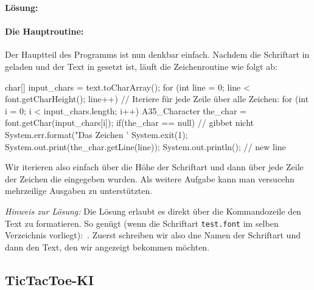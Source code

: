 \documentclass[table]{sopra-base}
\makeatletter
\let\T\texttt
\newenvironment{solution}{\null\par\noindent\textbf{\textcolor{sob@col@uulm@cs}{Lösung:}}\newline\bgroup\color{black}\slshape\ignorespaces}{\egroup}
\makeatother
\begin{document}
\begin{solution}
\paragraph{Die Hauptroutine:}
Der Hauptteil des Programms ist nun denkbar einfach. Nachdem die Schriftart in  geladen und der Text in  gesetzt ist, läuft die Zeichenroutine wie folgt ab:
\begin{java}[firstnumber=32]
char[] input_chars = text.toCharArray();
for (int line = 0; line < font.getCharHeight(); line++) {
    // Iteriere für jede Zeile über alle Zeichen:
    for (int i = 0; i < input_chars.length; i++) {
        A35_Character the_char = font.getChar(input_chars[i]);
        if(the_char == null) { // gibbet nicht
            System.err.format("Das Zeichen '%
            System.exit(1);
        }
        System.out.print(the_char.getLine(line));
    }
    System.out.println(); // new line
}
\end{java}
    Wir iterieren also einfach über die Höhe der Schriftart und dann über jede Zeile der Zeichen die eingegeben wurden. Als weitere Aufgabe kann man versucehn mehrzeilige Ausgaben zu unterstützten.\par{}
    \textit{Hinweis zur Lösung:} Die Lösung erlaubt es direkt über die Kommandozeile den Text zu formatieren. So genügt (wenn die Schriftart \T{test.font} im selben Verzeichnis vorliegt): \,. Zuerst schreiben wir also dne Namen der Schriftart und dann den Text, den wir angezeigt bekommen möchten.
    \egroup
\end{solution}

\subsection{TicTacToe-KI}
\end{document}
